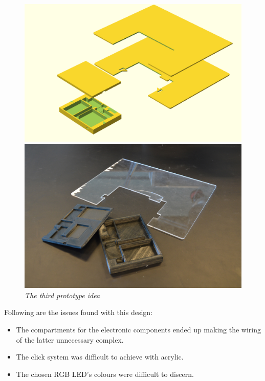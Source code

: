 \begin{figure}[h]
\begin{minipage}[b]{.5\textwidth}
\includegraphics[width=1.05\textwidth]{figures/iterations/v4.png}
\end{minipage}
\begin{minipage}[b]{.5\textwidth}
\includegraphics[width=1\textwidth]{figures/iterations/v4-photo.jpg}
\end{minipage}
\caption{\small {\it {The third prototype idea}}} 
\label{fig:v3}
\end{figure}

Following are the issues found with this design:

\begin{itemize} \itemsep0em
  \item The compartments for the electronic components ended up making the wiring of the latter unnecessary complex.
  \item The click system was difficult to achieve with acrylic.
  \item The chosen RGB LED's colours were difficult to discern.
\end{itemize}

